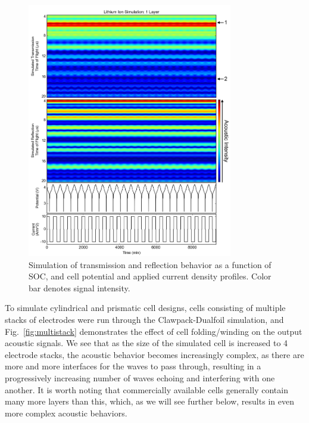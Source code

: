 \begin{figure}[htb]
  \centering
    \includegraphics[width=0.8\textwidth]{ch4-bw/images/lionsim.png}
    \caption[Simulation of echo behavior as a function of SOC.]{Simulation of transmission and reflection behavior as a function of SOC, and cell potential and applied current density profiles. Color bar denotes signal intensity.}
    \label{fig:lionsim}
\end{figure}

To simulate cylindrical and prismatic cell designs, cells consisting of multiple stacks of electrodes were run through the Clawpack-Dualfoil simulation, and Fig.~\ref{fig:multistack} demonstrates the effect of cell folding/winding on the output acoustic signals. We see that as the size of the simulated cell is increased to 4 electrode stacks, the acoustic behavior becomes increasingly complex, as there are more and more interfaces for the waves to pass through, resulting in a progressively increasing number of waves echoing and interfering with one another. It is worth noting that commercially available cells generally contain many more layers than this, which, as we will see further below, results in even more complex acoustic behaviors.


